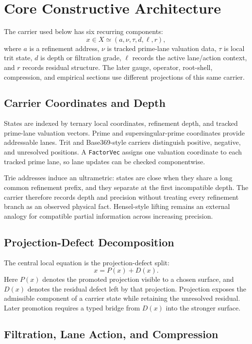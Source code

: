 \documentclass[11pt]{article}
\theoremstyle{definition}
\theoremstyle{plain}
\theoremstyle{remark}
\begin{document}
\section{Core Constructive Architecture}

The carrier used below has six recurring components:
\[
  x \in X \simeq (a,\nu,\tau,d,\ell,r),
\]
where \(a\) is a refinement address, \(\nu\) is tracked prime-lane valuation
data, \(\tau\) is local trit state, \(d\) is depth or filtration grade, \(\ell\)
records the active lane/action context, and \(r\) records residual structure.
The later gauge, operator, root-shell, compression, and empirical sections use
different projections of this same carrier.

\subsection{Carrier Coordinates and Depth}

States are indexed by ternary local coordinates, refinement depth, and tracked
prime-lane valuation vectors. Prime and supersingular-prime coordinates provide
addressable lanes. Trit and Base369-style carriers distinguish positive,
negative, and unresolved positions. A \texttt{FactorVec} assigns one valuation
coordinate to each tracked prime lane, so lane updates can be checked
componentwise.

Trie addresses induce an ultrametric: states are close when they share a long
common refinement prefix, and they separate at the first incompatible depth.
The carrier therefore records depth and precision without treating every
refinement branch as an observed physical fact. Hensel-style lifting remains an
external analogy for compatible partial information across increasing
precision.

\subsection{Projection-Defect Decomposition}

The central local equation is the projection-defect split:
\[
  x = P(x) + D(x).
\]
Here \(P(x)\) denotes the promoted projection visible to a chosen surface, and
\(D(x)\) denotes the residual defect left by that projection. Projection exposes
the admissible component of a carrier state while retaining the unresolved
residual. Later promotion requires a typed bridge from \(D(x)\) into the
stronger surface.

\subsection{Filtration, Lane Action, and Compression}
\end{document}
